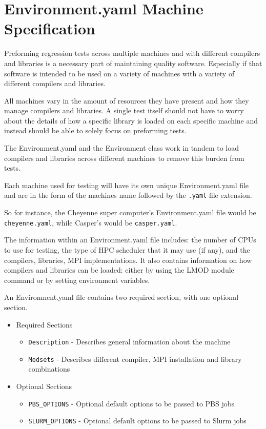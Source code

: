  \chapter{Environment.yaml Machine Specification}
 \label{chap:environment_file_spec}

Preforming regression tests across multiple machines and with different
compilers and libraries is a necessary part of maintaining quality software.
Especially if that software is intended to be used on a variety of machines
with a variety of different compilers and libraries.

All machines vary in the amount of resources they have present and how they
manage compilers and libraries. A single test itself should not have to worry
about the details of how a specific library is loaded on each specific machine
and instead should be able to solely focus on preforming tests.

The Environment.yaml and the Environment class work in tandem to load
compilers and libraries across different machines to remove this burden from
tests.

Each machine used for testing will have its own unique Environment.yaml file
and are in the form of the machines name followed by the {\tt .yaml} file
extension.

So for instance, the Cheyenne super computer's Environment.yaml file would be
{\tt cheyenne.yaml}, while Casper's would be {\tt casper.yaml}.

The information within an Environment.yaml file includes: the number of CPUs to
use for testing, the type of HPC scheduler that it may use (if any), and the
compilers, libraries, MPI implementations. It also contains information on how
compilers and libraries can be loaded: either by using the LMOD module command
or by setting environment variables.

An Environment.yaml file contains two required section, with one optional
section.

\begin{itemize}
\item Required Sections
    \begin{itemize}
        \item {\tt Description} - Describes general information about the machine
        \item {\tt Modsets} - Describes different compiler, MPI installation and library combinations
    \end{itemize}
\item Optional Sections
    \begin{itemize}
        \item {\tt PBS\_OPTIONS} - Optional default options to be passed to PBS jobs
        \item {\tt SLURM\_OPTIONS} - Optional default options to be passed to Slurm jobs
    \end{itemize}
\end{itemize}

